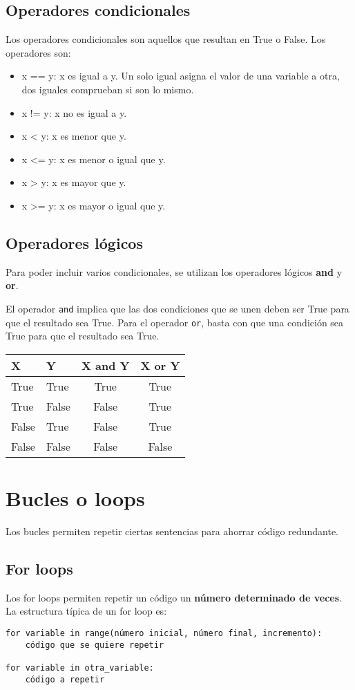 \subsection{Operadores condicionales}
Los operadores condicionales son aquellos que resultan en True o False. Los operadores son:
\begin{itemize}
\item x == y: x es igual a y. Un solo igual asigna el valor de una variable a otra, dos iguales comprueban si son lo mismo.
\item x != y: x no es igual a y.
\item x < y: x es menor que y.
\item x <= y: x es menor o igual que y.
\item x > y: x es mayor que y.
\item x >= y: x es mayor o igual que y. 
\end{itemize}

\subsection{Operadores lógicos}
Para poder incluir varios condicionales, se utilizan los operadores lógicos \textbf{and} y \textbf{or}. 

El operador \texttt{and} implica que las dos condiciones que se unen deben ser True para que el resultado sea True. Para el operador \texttt{or}, basta con que una condición sea True para que el resultado sea True.
\begin{table}[htbp]
	\centering
	\begin{tabularx}{0.5\textwidth}{XXcc}
	X & Y & X and Y & X or Y \\ \hline
	True & True & True & True \\
	True & False & False & True \\
	False & True & False & True \\
	False & False & False & False
	\end{tabularx}
\end{table}

\section{Bucles o loops}
Los bucles permiten repetir ciertas sentencias para ahorrar código redundante. 

\subsection{For loops}
Los for loops permiten repetir un código un \textbf{número determinado de veces}. La estructura típica de un for loop es:
\begin{lstlisting}
for variable in range(número inicial, número final, incremento):
	código que se quiere repetir
	
for variable in otra_variable:
	código a repetir
\end{lstlisting}

